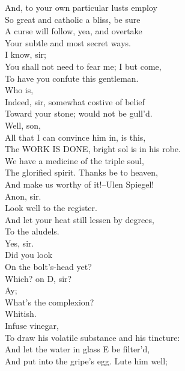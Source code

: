 \documentclass{memoir}
\begin{document}
\begin{drama*}
 And, to your own particular lusts employ\\
 So great and catholic a bliss, be sure\\
 A curse will follow, yea, and overtake\\
 Your subtle and most secret ways.\\
\mammonspeaks {} I know, sir;\\
 You shall not need to fear me; I but come,\\
 To have you confute this gentleman.\\
\surlyspeaks  Who is,\\
 Indeed, sir, somewhat costive of belief\\
 Toward your stone; would not be gull'd.\\
\subtlespeaks {} Well, son,\\
 All that I can convince him in, is this,\\
 The WORK IS DONE, bright sol is in his robe.\\
 We have a medicine of the triple soul,\\
 The glorified spirit. Thanks be to heaven,\\
 And make us worthy of it!--Ulen Spiegel!\\
\facespeaks {} Anon, sir.\\
\subtlespeaks  Look well to the register.\\
 And let your heat still lessen by degrees,\\
 To the aludels.\\
\facespeaks {} Yes, sir.\\
\subtlespeaks {} Did you look\\
 On the bolt's-head yet?\\
\facespeaks {} Which? on D, sir?\\
\subtlespeaks {} Ay;\\
 What's the complexion?\\
\facespeaks {} Whitish.\\
\subtlespeaks {} Infuse vinegar,\\
 To draw his volatile substance and his tincture:\\
 And let the water in glass E be filter'd,\\
 And put into the gripe's egg. Lute him well;\\

\end{drama*}
\end{document}
